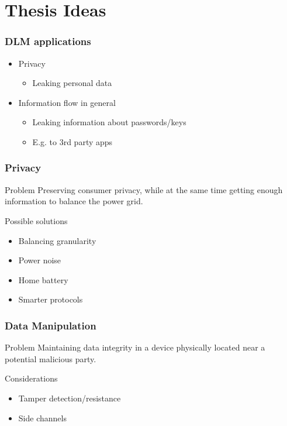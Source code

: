 
\section{Thesis Ideas}

\begin{frame}
  \frametitle{DLM applications}

  \begin{itemize}
    \item Privacy
    \begin{itemize}
      \item Leaking personal data
    \end{itemize} \vspace{1em}
    \item Information flow in general
    \begin{itemize}
      \item Leaking information about passwords/keys
      \item E.g. to 3rd party apps
    \end{itemize}
  \end{itemize}
\end{frame}

\begin{frame}
  \frametitle{Privacy}

  \begin{block}{Problem}
    Preserving consumer privacy, while at the same time getting enough information to balance the power grid.
  \end{block}

  \begin{block}{Possible solutions}
    \begin{itemize}
      \item Balancing granularity
      \item Power noise
      \item Home battery
      \item Smarter protocols
    \end{itemize}
  \end{block}
\end{frame}

\begin{frame}
  \frametitle{Data Manipulation}

  \begin{block}{Problem}
    Maintaining data integrity in a device physically located near a potential malicious party.
  \end{block}

  \begin{block}{Considerations}
    \begin{itemize}
      \item Tamper detection/resistance
      \item Side channels
    \end{itemize}
  \end{block}
\end{frame}

